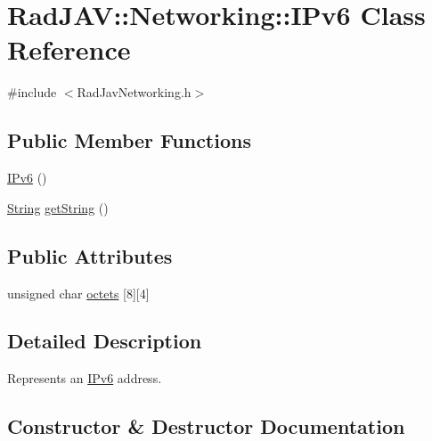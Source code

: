\hypertarget{class_rad_j_a_v_1_1_networking_1_1_i_pv6}{}\section{Rad\+J\+AV\+:\+:Networking\+:\+:I\+Pv6 Class Reference}
\label{class_rad_j_a_v_1_1_networking_1_1_i_pv6}


{\ttfamily \#include $<$Rad\+Jav\+Networking.\+h$>$}

\subsection*{Public Member Functions}
\begin{DoxyCompactItemize}
\item 
\mbox{\hyperlink{class_rad_j_a_v_1_1_networking_1_1_i_pv6_a92678ca95c5de27e3eeb5e929a39774b}{I\+Pv6}} ()
\item 
\mbox{\hyperlink{class_rad_j_a_v_1_1_string}{String}} \mbox{\hyperlink{class_rad_j_a_v_1_1_networking_1_1_i_pv6_afb1cd31e07ca3da8f952207a509db5b8}{get\+String}} ()
\end{DoxyCompactItemize}
\subsection*{Public Attributes}
\begin{DoxyCompactItemize}
\item 
unsigned char \mbox{\hyperlink{class_rad_j_a_v_1_1_networking_1_1_i_pv6_afc515bb7d6bce74a4d39c900e41924d3}{octets}} \mbox{[}8\mbox{]}\mbox{[}4\mbox{]}
\end{DoxyCompactItemize}


\subsection{Detailed Description}
Represents an \mbox{\hyperlink{class_rad_j_a_v_1_1_networking_1_1_i_pv6}{I\+Pv6}} address. 

\subsection{Constructor \& Destructor Documentation}
\mbox{\label{class_rad_j_a_v_1_1_networking_1_1_i_pv6_a92678ca95c5de27e3eeb5e929a39774b}} 
